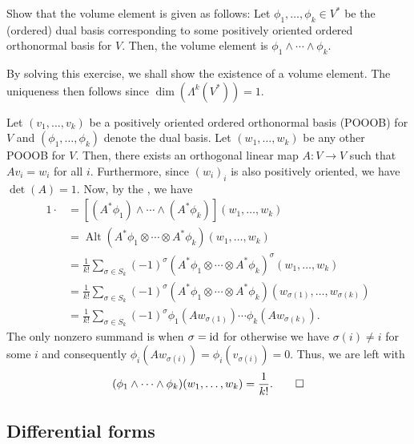 \documentclass[12pt]{article}
\DeclareMathOperator{\Alt}{Alt}
\begin{document}
\begin{exe}
	Show that the volume element is given as follows: Let $\phi_{1}, \ldots, \phi_{k} \in V^{\ast}$ be the (ordered) dual basis corresponding to some positively oriented ordered orthonormal basis for $V$. Then, the volume element is $\phi_{1} \wedge \cdots \wedge \phi_{k}$.
\end{exe}
\begin{soln}
	By solving this exercise, we shall show the existence of a volume element. The uniqueness then follows since $\dim(\Lambda^{k}(V^{\ast})) = 1$.

	Let $(v_{1}, \ldots, v_{k})$ be a positively oriented ordered orthonormal basis (POOOB) for $V$ and $(\phi_{1}, \ldots, \phi_{k})$ denote the dual basis. Let $(w_{1}, \ldots, w_{k})$ be any other POOOB for $V$. Then, there exists an orthogonal linear map $A : V \to V$ such that $Av_{i} = w_{i}$ for all $i$. Furthermore, since $(w_{i})_{i}$ is also positively oriented, we have $\det(A) = 1$. Now, by the , we have
	\begin{align*} 
		1 \cdot  &= \left[(A^{\ast} \phi_{1}) \wedge \cdots \wedge (A^{\ast} \phi_{k})\right](w_{1}, \ldots, w_{k}) \\
		&= \Alt(A^{\ast}\phi_{1} \otimes \cdots \otimes A^{\ast}\phi_{k})(w_{1}, \ldots, w_{k}) \\
		&= \frac{1}{k!} \sum_{\sigma \in S_{k}} (-1)^{\sigma} (A^{\ast}\phi_{1} \otimes \cdots \otimes A^{\ast}\phi_{k})^{\sigma}(w_{1}, \ldots, w_{k}) \\
		&= \frac{1}{k!} \sum_{\sigma \in S_{k}} (-1)^{\sigma} (A^{\ast}\phi_{1} \otimes \cdots \otimes A^{\ast}\phi_{k})(w_{\sigma(1)}, \ldots, w_{\sigma(k)}) \\
		&= \frac{1}{k!} \sum_{\sigma \in S_{k}} (-1)^{\sigma} \phi_{1}(Aw_{\sigma(1)}) \cdots \phi_{k}(Aw_{\sigma(k)}).
	\end{align*}
	The only nonzero summand is when $\sigma = \operatorname{id}$ for otherwise we have $\sigma(i) \neq i$ for some $i$ and consequently $\phi_{i}(Aw_{\sigma(i)}) = \phi_{i}(v_{\sigma(i)}) = 0$. Thus, we are left with
	\begin{equation*} 
		(\phi_{1} \wedge \cdots \wedge \phi_{k})(w_{1}, \ldots, w_{k}) = \frac{1}{k!}. \qedhere
	\end{equation*}
\end{soln}

\subsection{Differential forms}
\end{document}
